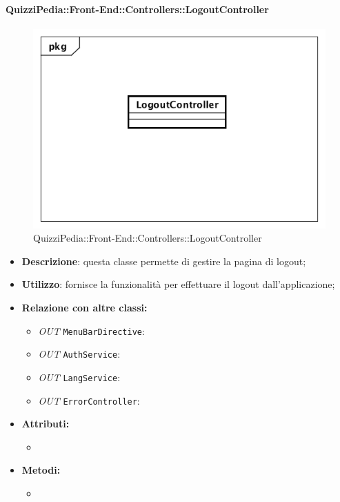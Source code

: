 \paragraph{QuizziPedia::Front-End::Controllers::LogoutController}
\begin{figure}
	\centering
	\includegraphics[scale=0.45]{UML/Classi/Front-End/QuizziPedia_Front-end_Controller_LogoutController.png}
	\caption{QuizziPedia::Front-End::Controllers::LogoutController}
\end{figure}
\begin{itemize}
	\item \textbf{Descrizione}: questa classe permette di gestire la pagina di logout;
	\item \textbf{Utilizzo}: fornisce la funzionalità per effettuare il logout dall'applicazione;
	\item \textbf{Relazione con altre classi:}
	\begin{itemize}
		\item \textit{OUT} \texttt{MenuBarDirective}:
		\item \textit{OUT} \texttt{AuthService}: 
		\item \textit{OUT} \texttt{LangService}:
		\item \textit{OUT} \texttt{ErrorController}: 
	\end{itemize}
	\item \textbf{Attributi:}
	\begin{itemize}
		\item 
	\end{itemize}
	\item \textbf{Metodi:}
	\begin{itemize}
		\item 
	\end{itemize}
\end{itemize}

